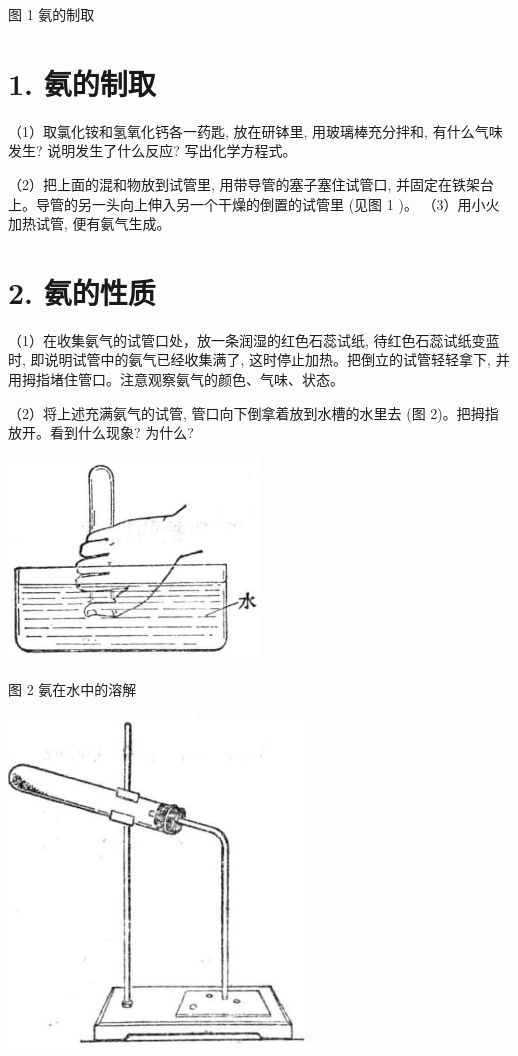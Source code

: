 \documentclass[10pt]{article}
\begin{document}
图 1 氨的制取

\section*{1. 氨的制取}

（1）取氯化铵和氢氧化钙各一药匙, 放在研钵里, 用玻璃棒充分拌和, 有什么气味发生? 说明发生了什么反应? 写出化学方程式。

（2）把上面的混和物放到试管里, 用带导管的塞子塞住试管口, 并固定在铁架台上。导管的另一头向上伸入另一个干燥的倒置的试管里 (见图 1 )。 （3）用小火加热试管, 便有氨气生成。

\section*{2. 氨的性质}

（1）在收集氨气的试管口处，放一条润湿的红色石蕊试纸, 待红色石蕊试纸变蓝时, 即说明试管中的氨气已经收集满了, 这时停止加热。把倒立的试管轻轻拿下, 并用拇指堵住管口。注意观察氨气的颜色、气味、状态。

（2）将上述充满氨气的试管, 管口向下倒拿着放到水槽的水里去 (图 2)。把拇指放开。看到什么现象? 为什么?

\begin{center}
\includegraphics[max width=0.5\textwidth]{images/01912d13-9986-7822-a012-3f3f7be99dcb_212_332964.jpg}
\end{center}

图 2 氨在水中的溶解

\begin{center}
\includegraphics[max width=0.6\textwidth]{images/01912d13-9986-7822-a012-3f3f7be99dcb_212_640634.jpg}
\end{center}
\end{document}
